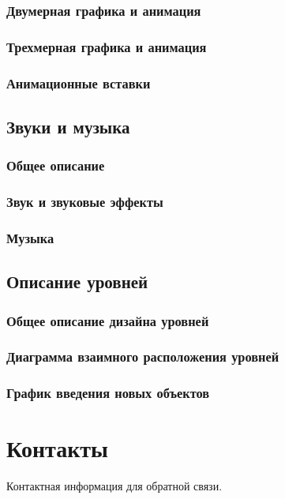 \documentclass{article}
\begin{document}
\subsubsection{Двумерная графика и анимация}


\subsubsection{Трехмерная графика и анимация}


\subsubsection{Анимационные вставки}


\subsection{Звуки и музыка}
\subsubsection{Общее описание}


\subsubsection{Звук и звуковые эффекты}


\subsubsection{Музыка}


\subsection{Описание уровней}
\subsubsection{Общее описание дизайна уровней}


\subsubsection{Диаграмма взаимного расположения уровней}


\subsubsection{График введения новых объектов}


\newpage

\section{Контакты}
Контактная информация для обратной связи.
\end{document}
